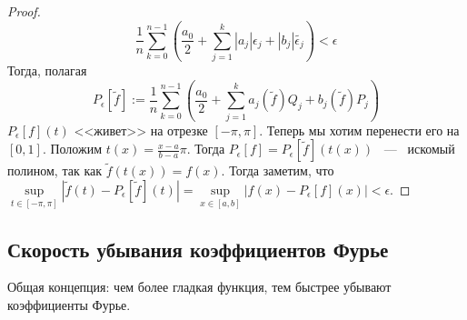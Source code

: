 \begin{proof}
    $$
    \dfrac{1}{n}\sum\limits_{k = 0}^{n - 1} (\dfrac{a_0}{2} + \sum\limits_{j = 1}^{k}|a_j|\epsilon_j + |b_j|\tilde{\epsilon_j}) < \epsilon
    $$
    Тогда, полагая
    $$
    P_{\epsilon}[\tilde{f}] := \frac{1}{n} \sum\limits_{k = 0}^{n - 1} (\frac{a_0}{2} + \sum\limits_{j = 1}^{k} a_j(\tilde{f}) Q_j + b_j(\tilde{f}) P_j)
    $$
    $P_{\epsilon}[f](t)$ <<живет>> на отрезке $[-\pi, \pi]$. Теперь мы хотим перенести его на $[0, 1]$. \newline
    Положим $t(x) = \frac{x - a}{b - a}\pi$. Тогда $P_{\epsilon}[f] = P_{\epsilon}[\tilde{f}](t(x))$ ~---~ искомый полином, так как $\tilde{f}(t(x)) = f(x)$. Тогда заметим, что $\sup\limits_{t \in [-\pi, \pi]} |\tilde{f}(t) - P_{\epsilon}[\tilde{f}](t)| = \sup\limits_{x \in [a, b]} | f(x) - P_{\epsilon}[f](x)| < \epsilon.$
\end{proof}

\subsection{Скорость убывания коэффициентов Фурье}
Общая концепция: чем более гладкая функция, тем быстрее убывают коэффициенты Фурье.

